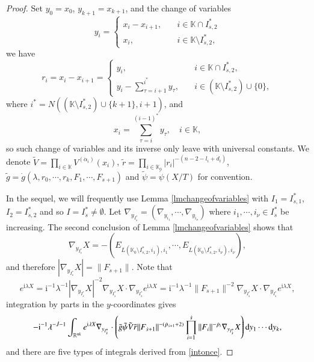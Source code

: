 \documentclass[11pt,reqno]{amsart}
\def\d{{\rm d}}
\numberwithin{equation}{section}
\theoremstyle{definition}
\begin{document}
\begin{proof}
	Set $y_0=x_0$, $y_{k+1}=x_{k+1}$, and the change of variables
	\begin{equation*}
		y_i=\begin{cases}
			x_i-x_{i+1},\quad&i\in\mathbb{K}\cap I_{\dot{s},2}^*\\
			x_i,&i\in\mathbb{K}\setminus I_{\dot{s},2}^*,
		\end{cases}
	\end{equation*}
	we have
	\begin{equation*}
		r_i=x_i-x_{i+1}=\begin{cases}
			y_i,&i\in\mathbb{K}\cap I_{\dot{s},2}^*,\\
			y_i-\sum_{\tau=i+1}^{i^*}y_\tau,\quad&i\in(\mathbb{K}\setminus I_{\dot{s},2}^*)\cup\{0\},
		\end{cases}
	\end{equation*}
	where $i^*=N((\mathbb{K}\setminus I_{\dot{s},2}^*)\cup\{k+1\},i+1)$, and	
	\begin{equation*}
		x_i=\sum_{\tau=i}^{(i-1)^*}y_\tau,\quad i\in\mathbb{K},
	\end{equation*}
	so such change of variables and its inverse only leave with universal constants. We denote $\tilde{V}=\prod_{i\in\mathbb{K}}V^{(\dot{\alpha}_i)}(x_i)$, $\tilde{r}=\prod_{i\in\mathbb{K}_0}|r_i|^{-(n-2-l_i+\dot{d}_i)}$, $\tilde{g}=\dot{g}(\lambda,r_0,\cdots,r_k,F_1,\cdots,F_{\dot{s}+1})$ and $\tilde{\psi}=\dot{\psi}(X/T)$ for convention.
	
	
	In the sequel, we will frequently use Lemma \ref{lmchangeofvariables} with $I_1=I_{\dot{s},1}^*$, $I_2=I_{\dot{s},2}^*$ and so $I=I_{\dot{s}}^*\neq\emptyset$. Let $\nabla_{y_{I_{\dot{s}}^*}}=(\nabla_{y_{i_1}},\cdots,\nabla_{y_{i_\nu}})$ where $i_1,\cdots,i_\nu\in I_{\dot{s}}^*$ be increasing. The second conclusion of Lemma \ref{lmchangeofvariables} shows that
	\begin{equation}\label{nablaX*}
		\nabla_{y_{I_{\dot{s}}^*}}X=-\left(E_{L(\mathbb{K}_0\setminus I_{\dot{s},2}^*,i_1),i_1},\cdots,E_{L(\mathbb{K}_0\setminus I_{\dot{s},2}^*,i_\nu),i_\nu}\right),
	\end{equation}
	and therefore $|\nabla_{y_{I_{\dot{s}}^*}}X|=\|F_{\dot{s}+1}\|$. Note that
	\begin{equation*}
		e^{\mathrm{i}\lambda X}=\mathrm{i}^{-1}\lambda^{-1}|\nabla_{y_{I_{\dot{s}}^*}}X|^{-2}\nabla_{y_{I_{\dot{s}}^*}}X\cdot\nabla_{y_{I_{\dot{s}}^*}}e^{\mathrm{i}\lambda X}=\mathrm{i}^{-1}\lambda^{-1}\|F_{\dot{s}+1}\|^{-2}\nabla_{y_{I_{\dot{s}}^*}}X\cdot\nabla_{y_{I_{\dot{s}}^*}}e^{\mathrm{i}\lambda X},
	\end{equation*}
	integration by parts in the $y$-coordinates gives
	\begin{equation}\label{intonce}
		-\mathrm{i}^{-1}\lambda^{-\dot{J}-1}\int_{\mathbb{R}^{nk}}e^{\mathrm{i}\lambda X}\nabla_{y_{I_{\dot{s}}^*}}\cdot\left(\tilde{g}\tilde{\psi}\tilde{V}\tilde{r}\|F_{\dot{s}+1}\|^{-(\dot{p}_{\dot{s}+1}+2)}\prod_{i=1}^{\dot{s}}\|F_i\|^{-{\dot{p}_i}}\nabla_{y_{I_{\dot{s}}^*}}X\right)\d y_1\cdots \d y_k,
	\end{equation}
	and there are five types of integrals derived from \eqref{intonce}.
	

\end{proof}
\end{document}
